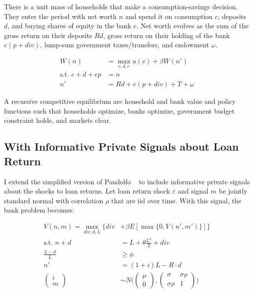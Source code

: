 \documentclass[12pt]{article}
\begin{document}
\bigskip

There is a unit mass of households that make a consumption-savings decision. They enter the period with net worth $n$ and spend it on consumption $c$, deposits $d$, and buying shares of equity in the bank $e$.  Net worth evolves as the sum of the gross return on their deposits $Rd$, gross return on their holding of the bank $e (p + div)$, lump-sum government taxes/transfers, and endowment $\omega$. 

\begin{align*}
W(n) &= \max_{c, d, e} u(c) + \beta W(n')\\
\text{s.t. } 
c + d + e p &= n\\
n' &= Rd + e (p + div) + T + \omega
\end{align*}

A recursive competitive equilibrium are household and bank value and policy functions such that households optimize, banks optimize, government budget constraint holds, and markets clear.

\subsection{With Informative Private Signals about Loan Return}

I extend the simplified version of Pandolfo ~\cite{pandolfo_2021} to include informative private signals about the shocks to loan returns.  Let loan return shock $\varepsilon$ and signal $m$ be jointly standard normal with correlation $\rho$ that are iid over time.  With this signal, the bank problem becomes:

\begin{align*}
V(n, m) = \max_{div, d, L} \Big\{ div &+ \beta E [\max\{0, V(n', m')\}]\Big\} \\
\text{s.t. } 
n + d &= L + \theta \frac{L^2}{2} + div\\
\frac{L - d}{L} & \ge \phi\\
n' &= (1 + i)L - R \cdot d \\
\begin{pmatrix} i \\ m \end{pmatrix} &\sim N \Bigg( \begin{pmatrix} \mu \\ 0 \end{pmatrix} , \begin{pmatrix} \sigma & \sigma \rho \\ \sigma\rho & 1\end{pmatrix} \Bigg)
\end{align*}
\end{document}
